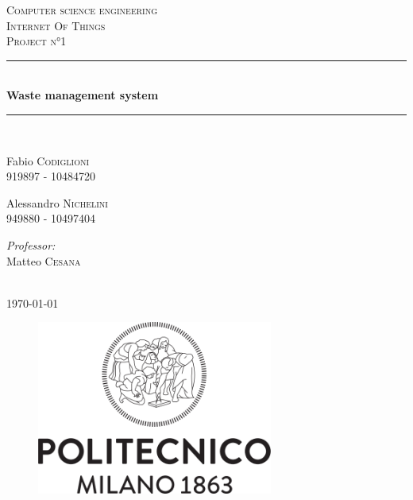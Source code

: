 \documentclass[a4paper, 11pt, parskip=half]{scrartcl}
\begin{document}
\begin{titlepage}
\newcommand{\HRule}{\rule{\linewidth}{0.1mm}} 
\center %
 

\textsc{Computer science engineering}\\[0.3cm] %
\textsc{\Large Internet Of Things}\\[0.5cm] %
\textsc{\large Project n°1}\\[0.5cm] %


\HRule \\[0.4cm]
{ \huge \bfseries Waste management system}\\[0.1cm] %
\HRule \\[1.5cm]
 

\begin{minipage}{0.4\textwidth}
\begin{flushleft} \large

Fabio \textsc{Codiglioni}\\ 919897 - 10484720  %
\end{flushleft}
\begin{flushleft} \large


Alessandro \textsc{Nichelini}\\ 949880 - 10497404  %
\end{flushleft}


\end{minipage}
\begin{minipage}{0.4\textwidth}
\begin{flushright} \large
\emph{Professor:} \\
Matteo \textsc{Cesana} %
\end{flushright}
\end{minipage}\\[1cm]
{\large \today}\\[1cm] %
\begin{figure}[H]
	\centering
	\includegraphics[width=\textwidth,height=5.7cm,keepaspectratio]{resources/polimi_logo}%
\end{figure}


\end{titlepage}
\end{document}
